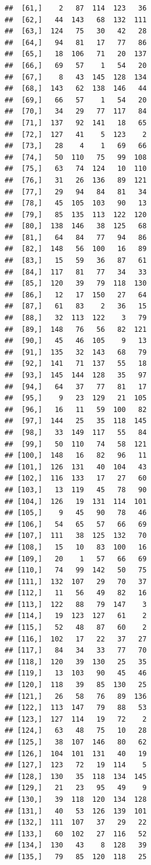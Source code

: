 \documentclass{article}\usepackage[]{graphicx}\usepackage[]{color}
\makeatletter
\newenvironment{kframe}{%
 \def\at@end@of@kframe{}%
 \ifinner\ifhmode%
  \def\at@end@of@kframe{\end{minipage}}%
  \begin{minipage}{\columnwidth}%
 \fi\fi%
 \def\FrameCommand##1{\hskip\@totalleftmargin \hskip-\fboxsep
 \colorbox{shadecolor}{##1}\hskip-\fboxsep
     \hskip-\linewidth \hskip-\@totalleftmargin \hskip\columnwidth}%
 \MakeFramed {\advance\hsize-\width
   \@totalleftmargin\z@ \linewidth\hsize
   \@setminipage}}%
 {\par\unskip\endMakeFramed%
 \at@end@of@kframe}
\newenvironment{knitrout}{}{} %
\makeatother
\begin{document}
\begin{knitrout}
\begin{kframe}
\begin{verbatim}
##  [61,]    2   87  114  123   36
##  [62,]   44  143   68  132  111
##  [63,]  124   75   30   42   28
##  [64,]   94   81   17   77   86
##  [65,]   18  106   71   20  137
##  [66,]   69   57    1   54   20
##  [67,]    8   43  145  128  134
##  [68,]  143   62  138  146   44
##  [69,]   66   57    1   54   20
##  [70,]   34   29   77  117   84
##  [71,]  137   92  141   18   65
##  [72,]  127   41    5  123    2
##  [73,]   28    4    1   69   66
##  [74,]   50  110   75   99  108
##  [75,]   63   74  124   10  110
##  [76,]   31   26  136   89  121
##  [77,]   29   94   84   81   34
##  [78,]   45  105  103   90   13
##  [79,]   85  135  113  122  120
##  [80,]  138  146   38  125   68
##  [81,]   64   84   77   94   86
##  [82,]  148   56  100   16   89
##  [83,]   15   59   36   87   61
##  [84,]  117   81   77   34   33
##  [85,]  120   39   79  118  130
##  [86,]   12   17  150   27   64
##  [87,]   61   83    2   36   15
##  [88,]   32  113  122    3   79
##  [89,]  148   76   56   82  121
##  [90,]   45   46  105    9   13
##  [91,]  135   32  143   68   79
##  [92,]  141   71  137   55   18
##  [93,]  145  144  128   35   97
##  [94,]   64   37   77   81   17
##  [95,]    9   23  129   21  105
##  [96,]   16   11   59  100   82
##  [97,]  144   25   35  118  145
##  [98,]   33  149  117   55   84
##  [99,]   50  110   74   58  121
## [100,]  148   16   82   96   11
## [101,]  126  131   40  104   43
## [102,]  116  133   17   27   60
## [103,]   13  119   45   78   90
## [104,]  126   19  131  114  101
## [105,]    9   45   90   78   46
## [106,]   54   65   57   66   69
## [107,]  111   38  125  132   70
## [108,]   15   10   83  100   16
## [109,]   20    1   57   66   69
## [110,]   74   99  142   50   75
## [111,]  132  107   29   70   37
## [112,]   11   56   49   82   16
## [113,]  122   88   79  147    3
## [114,]   19  123  127   61    2
## [115,]   52   48   87   60    2
## [116,]  102   17   22   37   27
## [117,]   84   34   33   77   70
## [118,]  120   39  130   25   35
## [119,]   13  103   90   45   46
## [120,]  118   39   85  130   25
## [121,]   26   58   76   89  136
## [122,]  113  147   79   88   53
## [123,]  127  114   19   72    2
## [124,]   63   48   75   10   28
## [125,]   38  107  146   80   62
## [126,]  104  101  131   40   19
## [127,]  123   72   19  114    5
## [128,]  130   35  118  134  145
## [129,]   21   23   95   49    9
## [130,]   39  118  120  134  128
## [131,]   40   53  126  139  101
## [132,]  111  107   37   29   22
## [133,]   60  102   27  116   52
## [134,]  130   43    8  128   39
## [135,]   79   85  120  118   25

\end{verbatim}
\end{kframe}
\end{knitrout}
\end{document}
